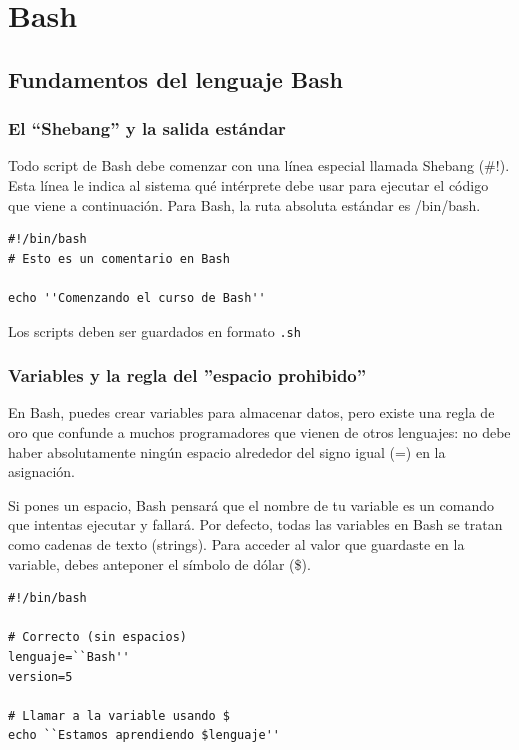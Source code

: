 \chapter{Bash}

\newpage
\section{Fundamentos del lenguaje Bash}

\subsection{El ``Shebang'' y la salida estándar}

Todo script de Bash debe comenzar con una línea especial llamada Shebang ($\#!$). Esta línea le indica al sistema qué intérprete debe usar para ejecutar el código que viene a continuación. Para Bash, la ruta absoluta estándar es /bin/bash.

\begin{ejemplo}
\begin{lstlisting}
#!/bin/bash
# Esto es un comentario en Bash

echo ''Comenzando el curso de Bash''
\end{lstlisting}
\end{ejemplo}

Los scripts deben ser guardados en formato \texttt{.sh}

\subsection{Variables y la regla del ''espacio prohibido''}

En Bash, puedes crear variables para almacenar datos, pero existe una regla de oro que confunde a muchos programadores que vienen de otros lenguajes: no debe haber absolutamente ningún espacio alrededor del signo igual (=) en la asignación.

Si pones un espacio, Bash pensará que el nombre de tu variable es un comando que intentas ejecutar y fallará. Por defecto, todas las variables en Bash se tratan como cadenas de texto (strings). Para acceder al valor que guardaste en la variable, debes anteponer el símbolo de dólar (\$).

\begin{ejemplo}
\begin{lstlisting}
#!/bin/bash

# Correcto (sin espacios)
lenguaje=``Bash''
version=5

# Llamar a la variable usando $
echo ``Estamos aprendiendo $lenguaje''
\end{lstlisting}
\end{ejemplo}

